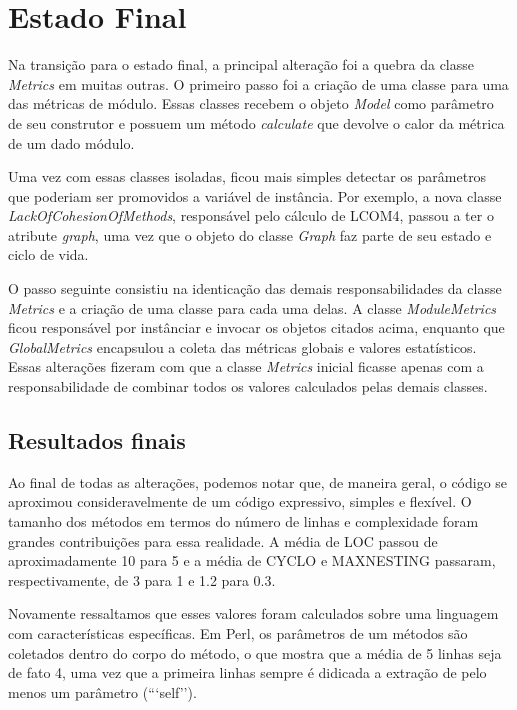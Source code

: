 \section{Estado Final}

Na transição para o estado final, a principal alteração foi a quebra da classe \textit{Metrics}
em muitas outras. O primeiro passo foi a criação de uma classe para uma das métricas de módulo.
Essas classes recebem o objeto \textit{Model} como parâmetro de seu construtor e possuem
um método \textit{calculate} que devolve o calor da métrica de um dado módulo.

Uma vez com essas classes isoladas, ficou mais simples detectar os parâmetros que poderiam
ser promovidos a variável de instância. Por exemplo, a nova classe \textit{LackOfCohesionOfMethods}, 
responsável pelo cálculo de LCOM4, passou a ter o atribute \textit{graph}, uma vez que 
o objeto do classe \textit{Graph} faz parte de seu estado e ciclo de vida.

O passo seguinte consistiu na identicação das demais responsabilidades da classe \textit{Metrics} 
e a criação de uma classe para cada uma delas. A classe \textit{ModuleMetrics} ficou responsável
por instânciar e invocar os objetos citados acima, enquanto que \textit{GlobalMetrics} encapsulou
a coleta das métricas globais e valores estatísticos. Essas alterações fizeram com que a classe
\textit{Metrics} inicial ficasse apenas com a responsabilidade de combinar todos os valores
calculados pelas demais classes.

\subsection{Resultados finais}
Ao final de todas as alterações, podemos notar que, de maneira geral, o código se aproximou
consideravelmente de um código expressivo, simples e flexível. O tamanho dos métodos em termos
do número de linhas e complexidade foram grandes contribuições para essa realidade. A média de
LOC passou de aproximadamente 10 para 5 e a média de CYCLO e MAXNESTING passaram, respectivamente,
de 3 para 1 e 1.2 para 0.3.

Novamente ressaltamos que esses valores foram calculados sobre uma linguagem com
características específicas. Em Perl, os parâmetros de um métodos são coletados dentro
do corpo do método, o que mostra que a média de 5 linhas seja de fato 4, uma vez que a
primeira linhas sempre é didicada a extração de pelo menos um parâmetro (```self'').

